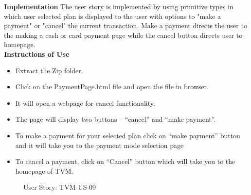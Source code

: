 \documentclass[a4paper,12pt]{report}
\begin{document}
\begin{flushleft}
	\textbf{Implementation}
	The user story is implemented by using primitive types in which user selected plan is displayed to the user with options to "make a payment" or "cancel" the current transaction. Make a payment directs the user to the making a cash or card payment page while the cancel button directs user to homepage. \\ 
	
	\vspace{0.5cm}
	\textbf{Instructions of Use}
	\begin{itemize}
		\item Extract the Zip folder.
		\item Click on the PaymentPage.html file and open the file in browser.
		\item It will open a webpage for cancel functionality.
		\item The page will display two buttons – “cancel” and “make payment”.
		\item To make a payment for your selected plan click on “make payment” button and it will take you to the payment mode selection page
		\item To cancel a payment, click on “Cancel” button which will take you to the homepage of TVM.
	\end{itemize}
	
	\begin{figure}[!htb]
		\caption{\label{fig:tvm09}User Story: TVM-US-09}	
	\end{figure}
	

\end{flushleft}
\end{document}
